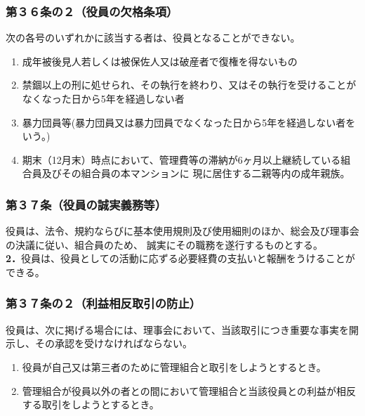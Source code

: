\documentclass[
  luatex,
  paper=a4paper,
  fontsize=11pt,
  jafontsize=11pt,
  jlreq_notes,
]{jlreq}
\begin{document}
  \subsubsection*{第３６条の２（役員の欠格条項）}
  次の各号のいずれかに該当する者は、役員となることができない。
  \begin{enumerate}
  \item 成年被後見人若しくは被保佐人又は破産者で復権を得ないもの
  \item 禁錮以上の刑に処せられ、その執行を終わり、又はその執行を受けることがなくなった日から5年を経過しない者
  \item 暴力団員等(暴力団員又は暴力団員でなくなった日から5年を経過しない者をいう。)
  \item 期末（12月末）時点において、管理費等の滞納が6ヶ月以上継続している組合員及びその組合員の本マンションに
  現に居住する二親等内の成年親族。
  \end{enumerate}
  \subsubsection*{第３７条（役員の誠実義務等）}
  役員は、法令、規約ならびに基本使用規則及び使用細則のほか、総会及び理事会の決議に従い、組合員のため、
  誠実にその職務を遂行するものとする。\\
  \textbf{2．}役員は、役員としての活動に応ずる必要経費の支払いと報酬をうけることができる。
  \subsubsection*{第３７条の２（利益相反取引の防止）}
  役員は、次に掲げる場合には、理事会において、当該取引につき重要な事実を開示し、その承認を受けなければならない。
  \begin{enumerate}
  \item 役員が自己又は第三者のために管理組合と取引をしようとするとき。
  \item 管理組合が役員以外の者との間において管理組合と当該役員との利益が相反する取引をしようとするとき。
  \end{enumerate}
\end{document}
